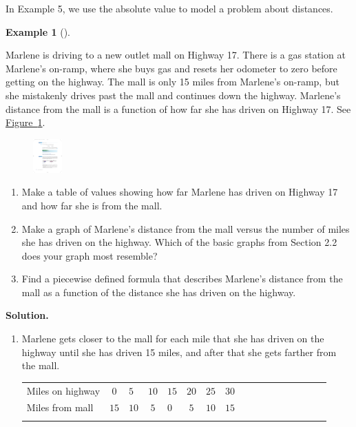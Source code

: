 \documentclass[10pt,]{book}
\theoremstyle{plain}
\theoremstyle{definition}
\theoremstyle{definition}
\theoremstyle{definition}
\newtheorem{example}[theorem]{Example}
\theoremstyle{definition}
\theoremstyle{definition}
\numberwithin{equation}{section}
\newcommand{\hrulethin}  {\noalign{\hrule height 0.04em}}
\newcommand{\hrulethick} {\noalign{\hrule height 0.11em}}
\begin{document}
    In Example 5, we use the absolute value to model a problem about distances.
%
\begin{example}[]\label{example-Marlene-highway}

        Marlene is driving to a new outlet mall on Highway 17. There is a gas station at Marlene's on-ramp, where she buys gas and resets her odometer to zero before getting on the highway. The mall is only 15 miles from Marlene’s on-ramp, but she mistakenly drives past the mall and continues down the highway. Marlene's distance from the mall is a function of how far she has driven on Highway 17. See \hyperref[fig-Marlene-highway]{Figure~\ref{fig-Marlene-highway}}.
\leavevmode%
\begin{figure}
\centering
\includegraphics[width=0.100\textwidth,]{images/fig-Marlene-highway.pdf}\caption{\label{fig-Marlene-highway}}
\end{figure}
\leavevmode%
\begin{enumerate}[label=*\alph**]
\item\hypertarget{li-361}{}Make a table of values showing how far Marlene has driven on Highway 17 and how far she is from the mall.\item\hypertarget{li-362}{}Make a graph of Marlene’s distance from the mall versus the number of miles she has driven on the highway. Which of the basic graphs from Section 2.2 does your graph most resemble?\item\hypertarget{li-363}{}Find a piecewise defined formula that describes Marlene’s distance from the mall as a function of the distance she has driven on the highway.\end{enumerate}
\par\medskip\noindent%
\textbf{Solution.}\quad \leavevmode%
\begin{enumerate}[label=*\alph**]
\item\hypertarget{li-364}{}Marlene gets closer to the mall for each mile that she has driven on the highway until she has driven 15 miles, and after that she gets farther from the mall.
        \leavevmode%
\begin{table}
\centering
\begin{tabular}{AcAcAcAcAcAcAcAcA}\hrulethick
Miles on highway%
&\(0\)&\(5\)&\(10\)&\(15\)&\(20\)&\(25\)&\(30\)\tabularnewline\hrulethin
Miles from mall%
&\(15\)&\(10\)&\(5\)&\(0\)&\(5\)&\(10\)&\(15\)\tabularnewline\hrulethin

\end{tabular}
\end{table}
\end{enumerate}
\end{example}
\end{document}

